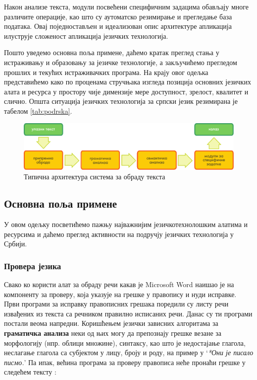 \begin{multicols}{2}
Након анализе текста, модули посвећени специфичним задацима о\-бав\-ља\-ју многе различите операције, као што су аутоматско резимирање и прегледање база података. Овај поједностављен и идеализован опис архитектуре апликација илуструје сложеност апликација језичких технологија. 

Пошто уведемо основна поља примене, даћемо кратак преглед стања у истраживању и образовању за језичке технологије, а закључићемо прегледом прошлих и текућих истраживачких програма. На крају овог одељка представићемо како по проценама стручњака изгледа позиција основних језичких алата и ресурса у простору чије димензије мере доступност, зрелост, квалитет и слично. 
Општа ситуација језичких технологија за српски језик резимирана је табелом \ref{tab:podrska}. 


\begin{figure}[htb]
  \center
  \includegraphics[width=\textwidth]{../_media/serbian/text_processing_app_architecture}
  \caption{Типична архитектура система за обраду текста}
  \label{fig:textprocessingarch_sr}
\end{figure}


 \subsection {Основна поља примене}
   
   У овом одељку посветићемо пажњу најважнијим језичкотехнолошким алатима и ресурсима и даћемо преглед активности на подручју језичких технологија у Србији. %
 \subsubsection {Провера језика}
   
Свако ко користи алат за обраду речи какав је Microsoft Word наишао је на компоненту за проверу, која указује на грешке у правопису и нуди исправке. Први програми за исправку правописних грешака поредили су листу речи извађених из текста са речником правилно исписаних речи. Данас су ти програми постали веома напредни. Коришћењем језички зависних алгоритама за \textbf{граматичка анализа} неки од њих могу да препознају грешке везане за морфологију (нпр. облици множине), синтаксу, као што је недостајање глагола, неслагање глагола са субјектом у лицу, броју и роду, на пример у ‘\textit{*Они је писало писмо.}’ Па ипак, већина програма за проверу правописа неће пронаћи грешке у следећем тексту \cite{ZAR}: 


\end{multicols}
